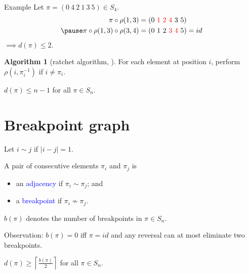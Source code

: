 \documentclass{beamer}
\theoremstyle{definition}
\newtheorem{algorithm}[theorem]{Algorithm}
\def\padding{\vspace{0.5cm}}
\def\spadding{\vspace{0.25cm}}
\def\b{\textcolor{blue}}
\def\r{\textcolor{red}}
\begin{document}
\begin{frame}

\begin{exampleblock}{Example}
Let $\pi = (0\ 4\ 2\ 1\ 3\ 5) \in S_4$.\pause
\begin{align*}
    \pi \circ \rho(1,3) &= (0\ \r{1\ 2\ 4}\ 3\ 5) \\ \pause
    \pi \circ \rho(1,3) \circ \rho(3,4) &= (0\ 1\ 2\ \r{3\ 4}\ 5) = id
\end{align*}\pause
$\implies d(\pi) \leq 2$.
\end{exampleblock}\pause\padding

\begin{algorithm}[ratchet algorithm, \citeauthor*{Watterson19821}]
For each element at position $i$, perform $\rho(i, \pi_i^{-1})$ if $i \neq \pi_i$.
\end{algorithm}\pause

\begin{corollary}
$d(\pi) \leq n - 1$ for all $\pi \in S_n$.
\end{corollary}

\end{frame}

\section{Breakpoint graph}

\begin{frame}

\begin{definition}
Let $i \sim j$ if $|i - j| = 1$. \par\pause
A pair of consecutive elements $\pi_i$ and $\pi_j$ is
\begin{itemize}
    \item an \b{adjacency} if $\pi_i \sim \pi_j$; and
    \item a \b{breakpoint} if $\pi_i \not\sim \pi_j$.
\end{itemize} \par\pause\spadding
$b(\pi)$ denotes the number of breakpoints in $\pi \in S_n$.
\end{definition}\pause\padding

Observation: $b(\pi) = 0$ iff $\pi = id$ and any reversal can at most eliminate two breakpoints. \pause\spadding

\begin{corollary}
$d(\pi) \geq \left\lceil \frac{b(\pi)}{2} \right\rceil$ for all $\pi \in S_n$.
\end{corollary}

\end{frame}
\end{document}

